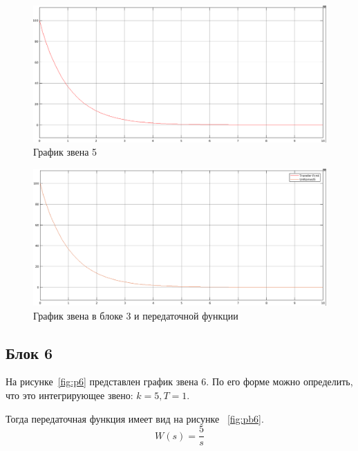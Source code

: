 \documentclass[12pt, a4paper] {ncc}
\begin{document}
    	\begin{figure}[ht!]
    		\includegraphics[scale=0.3]{./plot5.png}
			\caption{График звена 5}
			\label{fig:p5}
    	\end{figure}
    	\begin{figure}[ht!]
    		\includegraphics[scale=0.3]{./plot_both5.png}
			\caption{График звена в блоке 3 и передаточной функции}
			\label{fig:pb5}
    	\end{figure}

    \subsection{Блок 6}

		На рисунке~\ref{fig:p6} представлен график звена 6. По его форме можно определить,
		что это интегрирующее звено: $k = 5, T = 1$.
		
		Тогда передаточная функция имеет вид на рисунке ~\ref{fig:pb6}.
		\[ W(s) = \dfrac {5} {s}\]
\end{document}
